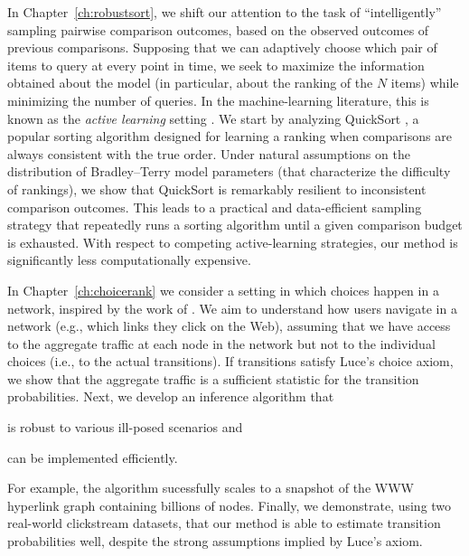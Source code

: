 In Chapter~\ref{ch:robustsort}, we shift our attention to the task of ``intelligently'' sampling pairwise comparison outcomes, based on the observed outcomes of previous comparisons.
Supposing that we can adaptively choose which pair of items to query at every point in time, we seek to maximize the information obtained about the model (in particular, about the ranking of the $N$ items) while minimizing the number of queries.
In the machine-learning literature, this is known as the \emph{active learning} setting \citep{settles2012active}.
We start by analyzing QuickSort \citep{hoare1962quicksort}, a popular sorting algorithm designed for learning a ranking when comparisons are always consistent with the true order.
Under natural assumptions on the distribution of Bradley--Terry model parameters (that characterize the difficulty of rankings), we show that QuickSort is remarkably resilient to inconsistent comparison outcomes.
This leads to a practical and data-efficient sampling strategy that repeatedly runs a sorting algorithm until a given comparison budget is exhausted.
With respect to competing active-learning strategies, our method is significantly less computationally expensive.

In Chapter~\ref{ch:choicerank} we consider a setting in which choices happen in a network, inspired by the work of \citet{kumar2015inverting}.
We aim to understand how users navigate in a network (e.g., which links they click on the Web), assuming that we have access to the aggregate traffic at each node in the network but not to the individual choices (i.e., to the actual transitions).
If transitions satisfy Luce's choice axiom, we show that the aggregate traffic is a sufficient statistic for the transition probabilities.
Next, we develop an inference algorithm that
\begin{enuminline}
\item is robust to various ill-posed scenarios and
\item can be implemented efficiently.
\end{enuminline}
For example, the algorithm sucessfully scales to a snapshot of the WWW hyperlink graph containing billions of nodes.
Finally, we demonstrate, using two real-world clickstream datasets, that our method is able to estimate transition probabilities well, despite the strong assumptions implied by Luce's axiom.

